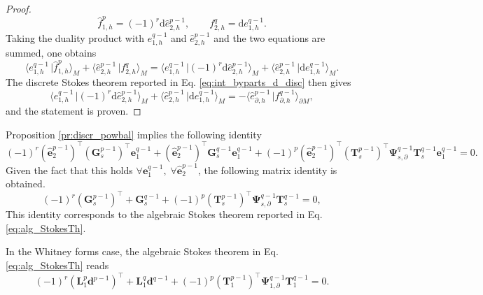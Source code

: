 \documentclass{elsarticle}
\newcommand{\revOne}[1]{{\color{black}#1}}
\renewcommand\d{\ensuremath{\mathrm{d}}}
\newcommand*{\dual}[1]{\ensuremath{\widehat{#1}}}
\newcommand{\dualpr}[3][]{\ensuremath{\langle #2 \, \vert #3 \rangle_{#1}}}
\begin{document}
{\begin{proof}
\begin{equation*}
    \dual{f}^p_{1, h} = (-1)^r \d \dual{e}^{p-1}_{2, h}, \qquad f^q_{2, h} = \d e^{q-1}_{1, h}.
\end{equation*}
    Taking the duality product with $e^{q-1}_{1, h}$ and $\dual{e}^{p-1}_{2, h}$ and the two equations are summed, one obtains
    \begin{equation*}
        \dualpr[M]{e^{q-1}_{1, h}}{\dual{f}^p_{1, h}} + \dualpr[M]{\dual{e}^{p-1}_{2, h}}{f^q_{2, h}} = \dualpr[M]{e^{q-1}_{1, h}}{(-1)^r \d \dual{e}^{p-1}_{2, h}} + \dualpr[M]{\dual{e}^{p-1}_{2, h}}{\d e^{q-1}_{1, h}}.
    \end{equation*}
    The discrete Stokes theorem reported in Eq. \eqref{eq:int_byparts_d_disc} then gives
    \begin{equation*}
        \dualpr[M]{e^{q-1}_{1, h}}{(-1)^r \d \dual{e}^{p-1}_{2, h}} + \dualpr[M]{\dual{e}^{p-1}_{2, h}}{\d e^{q-1}_{1, h}} = - \dualpr[\partial M]{\dual{e}_{\partial, h}^{p-1}}{f_{\partial, h}^{q-1}},
    \end{equation*}
and the statement is proven.
\end{proof}

Proposition \ref{pr:discr_powbal} implies the following identity
\begin{equation*}
    (-1)^r(\dual{\mathbf{e}}^{p-1}_2)^\top(\mathbf{G}^{p-1}_s)^\top \mathbf{e}^{q-1}_1 + (\dual{\mathbf{e}}^{p-1}_2)^\top\mathbf{G}^{q-1}_s \mathbf{e}^{q-1}_1+ (-1)^p (\dual{\mathbf{e}}^{p-1}_2)^\top(\mathbf{T}_s^{p-1})^\top \mathbf{\Psi}^{q-1}_{s, \partial} \mathbf{T}_s^{q-1}\mathbf{e}^{q-1}_1 = 0.
\end{equation*}
Given the fact that this holds $\forall \mathbf{e}^{q-1}_1, \; \forall \dual{\mathbf{e}}^{p-1}_2$, the following matrix identity is obtained.
\begin{equation}\label{eq:alg_StokesTh_pH}
    (-1)^r(\mathbf{G}^{p-1}_s)^\top + \mathbf{G}^{q-1}_s + (-1)^p (\mathbf{T}_s^{p-1})^\top \mathbf{\Psi}^{q-1}_{s, \partial} \mathbf{T}_s^{q-1} = 0,
\end{equation}
This identity corresponds to the algebraic Stokes theorem \revOne{reported in Eq. \eqref{eq:alg_StokesTh}}.} In the Whitney forms case, the algebraic Stokes theorem in Eq. \eqref{eq:alg_StokesTh} reads
\begin{equation}\label{eq:alg_StokesTh_W}
    (-1)^{r}(\mathbf{L}^{p}_1 \mathbf{d}^{p-1})^\top + \mathbf{L}^q_1 \mathbf{d}^{q-1} + (-1)^p (\mathbf{T}^{p-1}_1)^\top \mathbf{\Psi}^{q-1}_{1, \partial} \mathbf{T}^{q-1}_1 = 0.
\end{equation}
\end{document}
